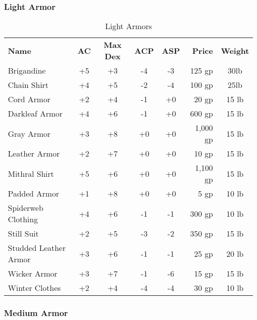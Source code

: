 \subsubsection{Light Armor}

\begin{table}[htb]
\caption{Light Armors}
\centering
\begin{tabular}{l *{4}{c} r c}
\textbf{Name} & \textbf{AC} & \textbf{Max Dex} & \textbf{ACP} & \textbf{ASP} & \textbf{Price} & \textbf{Weight}\\
Brigandine & +5 & +3 & -4 & -3 & 125 gp & 30lb\\
Chain Shirt & +4 & +5 & -2 & -4 & 100 gp & 25lb\\
Cord Armor & +2 & +4 & -1 & +0 & 20 gp & 15 lb\\
Darkleaf Armor & +4 & +6 & -1 & +0 & 600 gp & 15 lb\\
Gray Armor & +3 & +8 & +0 & +0 & 1,000 gp & 15 lb\\
Leather Armor & +2 & +7 & +0 & +0 & 10 gp & 15 lb\\
Mithral Shirt & +5 & +6 & +0 & +0 & 1,100 gp & 15 lb\\
Padded Armor & +1 & +8 & +0 & +0 & 5 gp & 10 lb\\
Spiderweb Clothing & +4 & +6 & -1 &  -1 & 300 gp & 10 lb\\
Still Suit & +2 & +5 & -3 & -2 & 350 gp & 15 lb\\
Studded Leather Armor & +3 & +6 & -1 & -1 & 25 gp & 20 lb\\
Wicker Armor & +3 & +7 & -1 & -6 & 15 gp & 15 lb\\
Winter Clothes & +2 & +4 & -4 & -4 & 30 gp & 10 lb\\
\end{tabular}
\end{table}


\subsubsection{Medium Armor}

